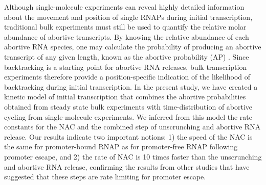 Although single-molecule experiments can reveal highly detailed information
about the movement and position of single RNAPs during initial transcription,
traditional bulk experiments must still be used to quantify the relative molar
abundance of abortive transcripts. By knowing the relative abundance of each
abortive RNA species, one may calculate the probability of producing an
abortive transcript of any given length, known as the abortive probability
(AP) \cite{hsu_promoter_2002, hsu_quantitative_1996}. Since backtracking is a
starting point for abortive RNA releases, bulk transcription experiments
therefore provide a position-specific indication of the likelihood of
backtracking during initial transcription. In the present study, we have
created a kinetic model of initial transcription that combines the abortive
probabilities obtained from steady state bulk experiments with
time-distribution of abortive cycling from single-molecule experiments. We
inferred from this model the rate constants for the NAC and the combined step
of unscrunching and abortive RNA release. Our results indicate two important
notions: 1) the speed of the NAC is the same for promoter-bound RNAP as
for promoter-free RNAP following promoter escape, and 2) the rate of NAC is 10
times faster than the unscrunching and abortive RNA release, confirming the
results from other studies that have suggested that these steps are
rate limiting for promoter escape.
